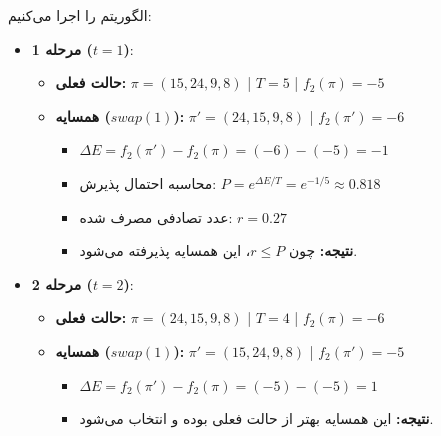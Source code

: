 \begin{ابجد}
\pagebreak

\item الگوریتم  را اجرا می‌کنیم:
\begin{itemize}
    \item \textbf{مرحله 1 ($t=1$)}:
          \begin{itemize}
              \item \textbf{حالت فعلی:} $\pi = (15, 24, 9, 8)$ | $T = 5$ | $f_2(\pi) = -5$
              \item \textbf{همسایه ($swap(1)$):} $\pi' = (24, 15, 9, 8)$ | $f_2(\pi') = -6$
                    \begin{itemize}
                        \item $\Delta E = f_2(\pi') - f_2(\pi) = (-6) - (-5) = -1$
                        \item محاسبه احتمال پذیرش: $P = e^{\Delta E / T} = e^{-1/5} \approx 0.818$
                        \item عدد تصادفی مصرف شده: $r = 0.27$
                        \item \textbf{نتیجه:} چون $r \le P$، این همسایه پذیرفته می‌شود.
                    \end{itemize}
          \end{itemize}

          \vspace{0.7cm}

    \item \textbf{مرحله 2 ($t=2$)}:
          \begin{itemize}
              \item \textbf{حالت فعلی:} $\pi = (24, 15, 9, 8)$ | $T = 4$ | $f_2(\pi) = -6$
              \item \textbf{همسایه ($swap(1)$):} $\pi' = (15, 24, 9, 8)$ | $f_2(\pi') = -5$
                    \begin{itemize}
                        \item $\Delta E = f_2(\pi') - f_2(\pi) = (-5) - (-5) = 1$
                        \item \textbf{نتیجه:} این همسایه بهتر از حالت فعلی بوده و انتخاب می‌شود.
                    \end{itemize}
          \end{itemize}

          \vspace{0.7cm}


\end{itemize}
\end{ابجد}
